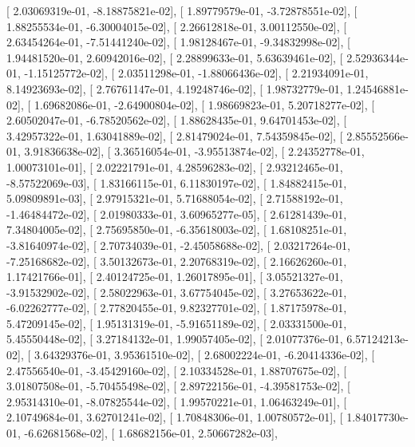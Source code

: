 \documentclass{article}
\begin{document}
       [  2.03069319e-01,  -8.18875821e-02],
       [  1.89779579e-01,  -3.72878551e-02],
       [  1.88255534e-01,  -6.30004015e-02],
       [  2.26612818e-01,   3.00112550e-02],
       [  2.63454264e-01,  -7.51441240e-02],
       [  1.98128467e-01,  -9.34832998e-02],
       [  1.94481520e-01,   2.60942016e-02],
       [  2.28899633e-01,   5.63639461e-02],
       [  2.52936344e-01,  -1.15125772e-02],
       [  2.03511298e-01,  -1.88066436e-02],
       [  2.21934091e-01,   8.14923693e-02],
       [  2.76761147e-01,   4.19248746e-02],
       [  1.98732779e-01,   1.24546881e-02],
       [  1.69682086e-01,  -2.64900804e-02],
       [  1.98669823e-01,   5.20718277e-02],
       [  2.60502047e-01,  -6.78520562e-02],
       [  1.88628435e-01,   9.64701453e-02],
       [  3.42957322e-01,   1.63041889e-02],
       [  2.81479024e-01,   7.54359845e-02],
       [  2.85552566e-01,   3.91836638e-02],
       [  3.36516054e-01,  -3.95513874e-02],
       [  2.24352778e-01,   1.00073101e-01],
       [  2.02221791e-01,   4.28596283e-02],
       [  2.93212465e-01,  -8.57522069e-03],
       [  1.83166115e-01,   6.11830197e-02],
       [  1.84882415e-01,   5.09809891e-03],
       [  2.97915321e-01,   5.71688054e-02],
       [  2.71588192e-01,  -1.46484472e-02],
       [  2.01980333e-01,   3.60965277e-05],
       [  2.61281439e-01,   7.34804005e-02],
       [  2.75695850e-01,  -6.35618003e-02],
       [  1.68108251e-01,  -3.81640974e-02],
       [  2.70734039e-01,  -2.45058688e-02],
       [  2.03217264e-01,  -7.25168682e-02],
       [  3.50132673e-01,   2.20768319e-02],
       [  2.16626260e-01,   1.17421766e-01],
       [  2.40124725e-01,   1.26017895e-01],
       [  3.05521327e-01,  -3.91532902e-02],
       [  2.58022963e-01,   3.67754045e-02],
       [  3.27653622e-01,  -6.02262777e-02],
       [  2.77820455e-01,   9.82327701e-02],
       [  1.87175978e-01,   5.47209145e-02],
       [  1.95131319e-01,  -5.91651189e-02],
       [  2.03331500e-01,   5.45550448e-02],
       [  3.27184132e-01,   1.99057405e-02],
       [  2.01077376e-01,   6.57124213e-02],
       [  3.64329376e-01,   3.95361510e-02],
       [  2.68002224e-01,  -6.20414336e-02],
       [  2.47556540e-01,  -3.45429160e-02],
       [  2.10334528e-01,   1.88707675e-02],
       [  3.01807508e-01,  -5.70455498e-02],
       [  2.89722156e-01,  -4.39581753e-02],
       [  2.95314310e-01,  -8.07825544e-02],
       [  1.99570221e-01,   1.06463249e-01],
       [  2.10749684e-01,   3.62701241e-02],
       [  1.70848306e-01,   1.00780572e-01],
       [  1.84017730e-01,  -6.62681568e-02],
       [  1.68682156e-01,   2.50667282e-03],
\end{document}
